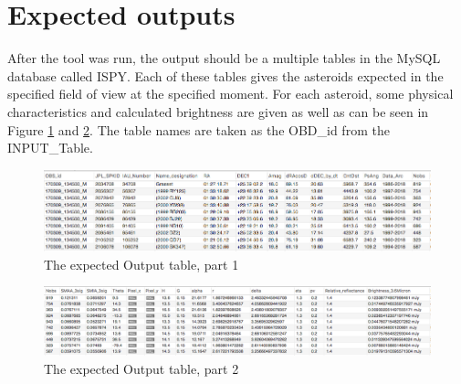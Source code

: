 \section{Expected outputs}
After the tool was run, the output should be a multiple tables in the MySQL database called ISPY. Each of these tables gives the asteroids expected in the specified field of view at the specified moment. For each asteroid, some physical characteristics and calculated brightness are given as well as can be seen in Figure \ref{fig:2} and \ref{fig:3}. The table names are taken as the OBD\_id from the INPUT\_Table. \\

\begin{figure}[h]
    \centering
    \includegraphics[width=1\textwidth]{Figures/Output1.png}
    \caption{The expected Output table, part 1}
    \label{fig:2}
\end{figure}

\begin{figure}[h]
    \centering
    \includegraphics[width=1\textwidth]{Figures/Output2.png}
    \caption{The expected Output table, part 2}
    \label{fig:3}
\end{figure}

